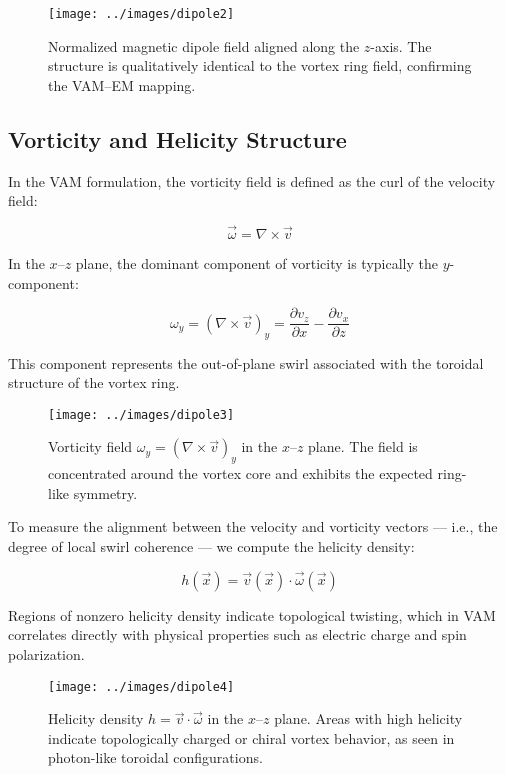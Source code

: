 \begin{figure}[H]
    \centering
    \texttt{[image: ../images/dipole2]}
    \caption{Normalized magnetic dipole field aligned along the $z$-axis. The structure is qualitatively identical to the vortex ring field, confirming the VAM–EM mapping.}
\end{figure}

\subsection{Vorticity and Helicity Structure}

In the VAM formulation, the vorticity field is defined as the curl of the velocity field:

\begin{equation}
\vec{\omega} = \nabla \times \vec{v}
\end{equation}

In the $x$–$z$ plane, the dominant component of vorticity is typically the $y$-component:

\begin{equation}
\omega_y = (\nabla \times \vec{v})_y = \frac{\partial v_z}{\partial x} - \frac{\partial v_x}{\partial z}
\end{equation}

This component represents the out-of-plane swirl associated with the toroidal structure of the vortex ring.

\begin{figure}[H]
    \centering
    \texttt{[image: ../images/dipole3]}
    \caption{Vorticity field $\omega_y = (\nabla \times \vec{v})_y$ in the $x$–$z$ plane. The field is concentrated around the vortex core and exhibits the expected ring-like symmetry.}
\end{figure}

To measure the alignment between the velocity and vorticity vectors — i.e., the degree of local swirl coherence — we compute the helicity density:

\begin{equation}
h(\vec{x}) = \vec{v}(\vec{x}) \cdot \vec{\omega}(\vec{x})
\end{equation}

Regions of nonzero helicity density indicate topological twisting, which in VAM correlates directly with physical properties such as electric charge and spin polarization.

\begin{figure}[H]
    \centering
    \texttt{[image: ../images/dipole4]}
    \caption{Helicity density $h = \vec{v} \cdot \vec{\omega}$ in the $x$–$z$ plane. Areas with high helicity indicate topologically charged or chiral vortex behavior, as seen in photon-like toroidal configurations.}
\end{figure}



